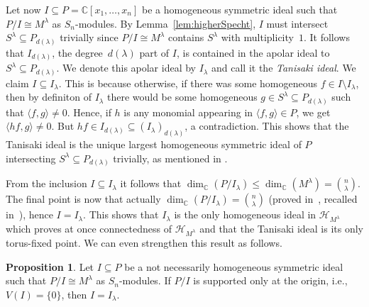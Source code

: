 \documentclass[11pt]{amsart}
\theoremstyle{definition}
\newtheorem{proposition}[theorem]{Proposition}
\newcommand{\CC}{\mathbb{C}}
\begin{document}
Let now $I \subseteq P = \CC[x_1,\ldots,x_n]$ be a homogeneous symmetric ideal such that $P/I \cong M^\lambda$ as $S_n$-modules.
By Lemma~\ref{lem:higherSpecht}, $I$ must intersect $S^\lambda \subseteq P_{d(\lambda)}$ trivially since $P/I \cong M^\lambda$ contains $S^\lambda$ with multiplicity~$1$. It follows that $I_{d(\lambda)}$, the degree~$d(\lambda)$ part of $I$, is contained in the apolar ideal to $S^\lambda \subseteq P_{d(\lambda)}$. We denote this apolar ideal by $I_\lambda$ and call it the \emph{Tanisaki ideal}. We claim $I \subseteq I_\lambda$. This is because otherwise, if there was some homogeneous $f \in I \setminus I_\lambda$, then by definiton of $I_\lambda$ there would be some homogeneous $g \in S^\lambda \subseteq P_{d(\lambda)}$ such that $\langle f, g \rangle \neq 0$. Hence, if $h$ is any monomial appearing in $\langle f, g \rangle \in P$, we get $\langle hf, g \rangle \neq 0$. But $hf \in I_{d(\lambda)} \subseteq (I_\lambda)_{d(\lambda)}$, a contradiction. This shows that the Tanisaki ideal is the unique largest homogeneous symmetric ideal of $P$ intersecting $S^\lambda \subseteq P_{d(\lambda)}$ trivially, as mentioned in \cite[p.~62]{Haiman2003Combinatorics}.

From the inclusion $I \subseteq I_\lambda$ it follows that $\dim_\CC(P/I_\lambda) \leq \dim_\CC(M^\lambda) = \binom{n}{\lambda}$. The final point is now that actually $\dim_\CC(P/I_\lambda) = \binom{n}{\lambda}$ (proved in~\cite{BergeronGarsia1992Harmonic}, recalled in~\cite[Lemma~3.4.17]{Haiman2003Combinatorics}), hence $I = I_\lambda$. This shows that $I_\lambda$ is the only homogeneous ideal in $\mathcal{H}_{M^\lambda}$ which proves at once connectedness of $\mathcal{H}_{M^\lambda}$ and that the Tanisaki ideal is its only torus-fixed point. We can even strengthen this result as follows.

\begin{proposition}\label{prop:singleton}
    Let $I \subseteq P$ be a not necessarily homogeneous symmetric ideal such that $P/I \cong M^\lambda$ as $S_n$-modules. If $P/I$ is supported only at the origin, i.e., $V(I) = \{0\}$, then $I = I_\lambda$.
\end{proposition}
\end{document}
